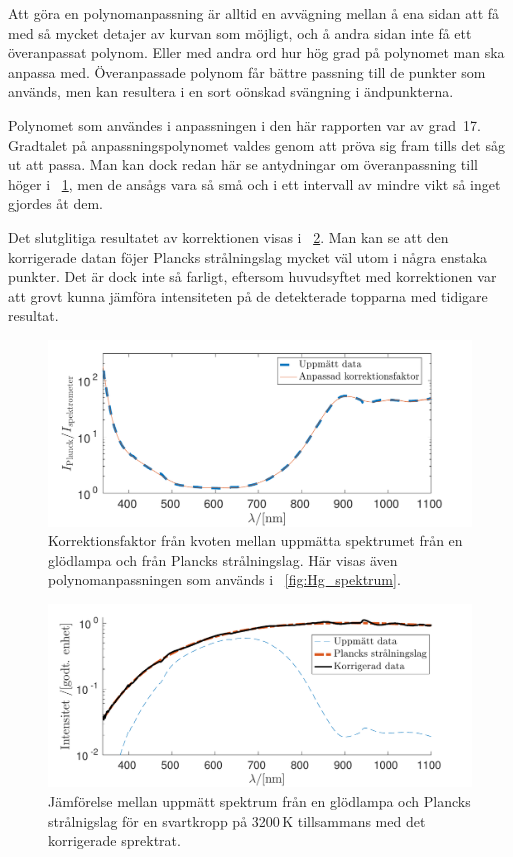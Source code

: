\documentclass[11pt,a4paper]{article}
\newcommand{\figref}{\figurename~\ref}
\begin{document}
Att göra en polynomanpassning är alltid en avvägning mellan å ena
sidan att få med så mycket detajer av kurvan som möjligt, och å andra
sidan inte få ett överanpassat polynom. Eller med andra ord hur hög
grad på polynomet man ska anpassa med. Överanpassade polynom får
bättre passning till de punkter som används, men kan resultera i en
sort oönskad svängning i ändpunkterna. 

Polynomet som användes i anpassningen i den här rapporten var av
grad~17. Gradtalet på anpassningspolynomet valdes genom att pröva sig
fram tills det såg ut att passa. Man kan dock redan här se antydningar
om överanpassning till höger i \figref{fig:korrektionsfaktor}, men de
ansågs vara så små och i ett intervall av mindre vikt så inget gjordes
åt dem. 

Det slutglitiga resultatet av korrektionen visas i
\figref{fig:anpassad_svartkropp}. Man kan se att den korrigerade datan
föjer Plancks strålningslag mycket väl utom i några enstaka
punkter. Det är dock inte så farligt, eftersom huvudsyftet med
korrektionen var att grovt kunna jämföra intensiteten på de
detekterade topparna med tidigare resultat. 

\begin{figure}\centering
\centerline{ %
\includegraphics[width=.8\textwidth]{korrektionsfaktor.pdf}
}
\caption{Korrektionsfaktor från kvoten mellan uppmätta spektrumet från
en glödlampa och från Plancks strålningslag. Här visas även
polynomanpassningen som används i \figref{fig:Hg_spektrum}.}
\label{fig:korrektionsfaktor}
\end{figure}

\begin{figure}\centering
\centerline{ %
\includegraphics[width=.8\textwidth]{anpassad_svartkropp.pdf}
}
\caption{Jämförelse mellan uppmätt spektrum från en glödlampa och
  Plancks strålnigslag för en svartkropp på 3200\,K tillsammans med
  det korrigerade sprektrat. }
\label{fig:anpassad_svartkropp}
\end{figure}
\end{document}
